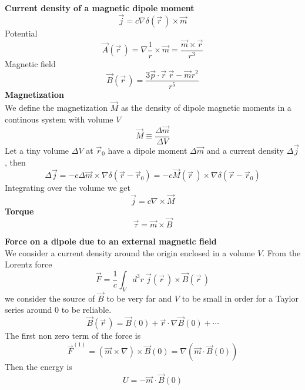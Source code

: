 \documentclass[12pt,a4paper]{article}
\newcommand{\integral}[3]{\int_{#1}^{#2} d #3 \ } %
\begin{document}
\textbf{Current density of a magnetic dipole moment}
\begin{equation}
	\vec{j} = c \nabla \delta (\vec{r}\, ) \times \vec{m}
\end{equation}
Potential
\begin{equation}
	\vec{A}(\vec{r}\,) = \nabla\frac{1}{r} \times \vec{m}  = \frac{\vec{m}\times \vec{r}}{r^3}
\end{equation}
Magnetic field
\begin{equation}
	\vec{B}(\vec{r}\,) =  \frac{3\vec{p}\cdot \vec{r} \ \vec{r}-\vec{m}r^2}{r^5}
\end{equation}
\textbf{Magnetization}\\
We define the magnetization $\vec{M}$ as the density of dipole magnetic moments in a continous system with volume $V$
\begin{equation}
	\vec{M} \equiv \frac{\Delta \vec{m}}{\Delta V}
\end{equation}
Let a tiny volume $\Delta V$ at $\vec{r}_0$ have a dipole moment $\Delta \vec{m}$ and a current density $\Delta \vec{j}$, then
\begin{equation}
	\Delta \vec{j} = -c\Delta \vec{m}  \times \nabla \delta (\vec{r} -\vec{r}_0) = - c\vec{M}(\vec{r}\,) \times \nabla \delta (\vec{r} -\vec{r}_0)
\end{equation}
Integrating over the volume we get
\begin{equation}
 \vec{j} = c\nabla\times \vec{M}
\end{equation}
\textbf{Torque}
\begin{equation}
	\vec{\tau} = \vec{m} \times \vec{B}
\end{equation}


\textbf{Force on a dipole due to an external magnetic field} \\
We consider a current density around the origin enclosed in a volume $V$. From the Lorentz force
\begin{equation}
	\vec{F} = \frac{1}{c} \integral{V}{}{^3r} \vec{j}(\vec{r}\,) \times \vec{B}(\vec{r}\,)
\end{equation}
we consider the source of $\vec{B}$ to be  very far and $V$ to be small in order for a Taylor series around 0 to be reliable.
\begin{equation}
\vec{B}(\vec{r}\,) = \vec{B}(0) + \vec{r} \cdot \nabla \vec{B}(0) + \cdots
\end{equation}
The first non zero term of the force is
\begin{equation}
	\vec{F}^{(1)} = (\vec{m} \times \nabla) \times \vec{B}(0) = \nabla(\vec{m} \cdot \vec{B}(0))
\end{equation}
Then the energy is
\begin{equation}
	U = - \vec{m} \cdot \vec{B}(0)
\end{equation}
\end{document}
